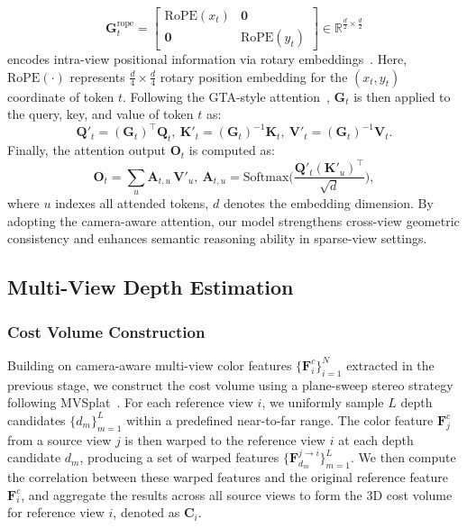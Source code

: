 \documentclass[letterpaper, 10 pt, conference]{ieeeconf}  %
\begin{document}
\begin{equation}
\mathbf{G}^{\mathrm{rope}}_{t}=
\begin{bmatrix}
\mathrm{RoPE}(x_t) & \mathbf{0}\\
\mathbf{0} & \mathrm{RoPE}(y_t)
\end{bmatrix} \in \mathbb{R}^{\frac{d}{2} \times \frac{d}{2}}
\end{equation}
encodes intra-view positional information via rotary embeddings~\cite{rope}. Here, $\mathrm{RoPE}(\cdot)$ represents $\frac{d}{4}\times \frac{d}{4}$ rotary position embedding for the $(x_t, y_t)$ coordinate of token $t$.
Following the GTA-style attention~\cite{GTA}, $\mathbf{G}_{t}$ is then applied to the query, key, and value of token $t$ as:
\begin{equation}
\mathbf{Q}'_{t}=(\mathbf{G}_{t})^\top\mathbf{Q}_{t},\ 
\mathbf{K}'_{t}=(\mathbf{G}_{t})^{-1}\mathbf{K}_{t},\ 
\mathbf{V}'_{t}=(\mathbf{G}_{t})^{-1}\mathbf{V}_{t}.
\end{equation}
Finally, the attention output $\mathbf{O}_{t}$ is computed as:
\begin{equation}
\mathbf{O}_{t}=\sum_{u}\mathbf{A}_{t,u}\,\mathbf{V}'_{u},\ 
\mathbf{A}_{t,u}=\mathrm{Softmax}\Big(\frac{\mathbf{Q}'_{t}(\mathbf{K}'_{u})^\top}{\sqrt{d}}\Big),
\end{equation}
where $u$ indexes all attended tokens, $d$ denotes the embedding dimension.
By adopting the camera-aware attention, our model strengthens cross-view geometric consistency and enhances semantic reasoning ability in sparse-view settings.

\subsection{Multi-View Depth Estimation}
\label{sec:depth}
\subsubsection{Cost Volume Construction}
Building on camera-aware multi-view color features \(\{\mathbf{F}^c_i\}_{i=1}^N\) extracted in the previous stage, we construct the cost volume using a plane-sweep stereo strategy following MVSplat~\cite{mvsplat}.
For each reference view \(i\), we uniformly sample \(L\) depth candidates \(\{d_m\}_{m=1}^L\) within a predefined near-to-far range. The color feature \(\mathbf{F}^c_j\) from a source view \(j\) is then warped to the reference view \(i\) at each depth candidate \(d_m\), producing a set of warped features \(\{\mathbf{F}^{j \rightarrow i}_{d_m}\}_{m=1}^L\).
We then compute the correlation between these warped features and the original reference feature \(\mathbf{F}^c_i\), and aggregate the results across all source views to form the 3D cost volume for reference view \(i\), denoted as \(\mathbf{C}_i\).
\end{document}
